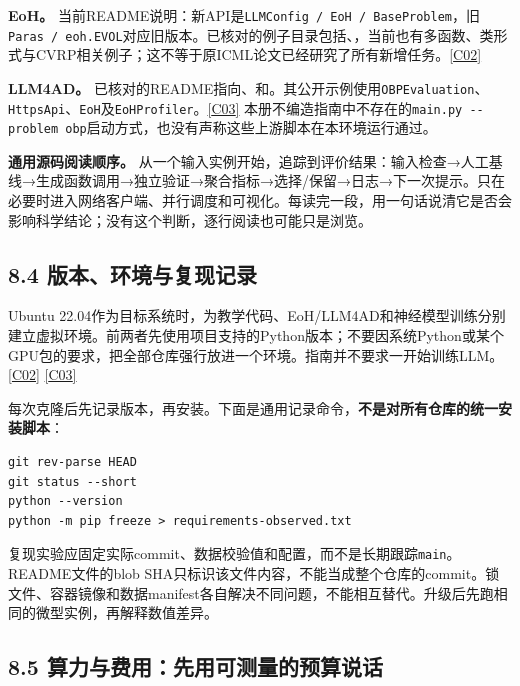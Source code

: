 \textbf{EoH。}
当前README说明：新API是\texttt{LLMConfig\ /\ EoH\ /\ BaseProblem}，旧\texttt{Paras\ /\ eoh.EVOL}对应旧版本。已核对的例子目录包括、，当前也有多函数、类形式与CVRP相关例子；这不等于原ICML论文已经研究了所有新增任务。\href{https://github.com/FeiLiu36/EoH}{{[}C02{]}}

\textbf{LLM4AD。}
已核对的README指向、和。其公开示例使用\texttt{OBPEvaluation}、\texttt{HttpsApi}、\texttt{EoH}及\texttt{EoHProfiler}。\href{https://github.com/Optima-CityU/LLM4AD}{{[}C03{]}}
本册不编造指南中不存在的\texttt{main.py\ -\/-problem\ obp}启动方式，也没有声称这些上游脚本在本环境运行通过。

\textbf{通用源码阅读顺序。}
从一个输入实例开始，追踪到评价结果：输入检查→人工基线→生成函数调用→独立验证→聚合指标→选择/保留→日志→下一次提示。只在必要时进入网络客户端、并行调度和可视化。每读完一段，用一句话说清它是否会影响科学结论；没有这个判断，逐行阅读也可能只是浏览。

\subsection{8.4
版本、环境与复现记录}\label{ux7248ux672cux73afux5883ux4e0eux590dux73b0ux8bb0ux5f55}

Ubuntu
22.04作为目标系统时，为教学代码、EoH/LLM4AD和神经模型训练分别建立虚拟环境。前两者先使用项目支持的Python版本；不要因系统Python或某个GPU包的要求，把全部仓库强行放进一个环境。指南并不要求一开始训练LLM。\href{https://github.com/FeiLiu36/EoH}{{[}C02{]}}
\href{https://github.com/Optima-CityU/LLM4AD}{{[}C03{]}}

每次克隆后先记录版本，再安装。下面是通用记录命令，\textbf{不是对所有仓库的统一安装脚本}：

\begin{verbatim}
git rev-parse HEAD
git status --short
python --version
python -m pip freeze > requirements-observed.txt
\end{verbatim}

复现实验应固定实际commit、数据校验值和配置，而不是长期跟踪\texttt{main}。README文件的blob
SHA只标识该文件内容，不能当成整个仓库的commit。锁文件、容器镜像和数据manifest各自解决不同问题，不能相互替代。升级后先跑相同的微型实例，再解释数值差异。

\subsection{8.5
算力与费用：先用可测量的预算说话}\label{ux7b97ux529bux4e0eux8d39ux7528ux5148ux7528ux53efux6d4bux91cfux7684ux9884ux7b97ux8bf4ux8bdd}

